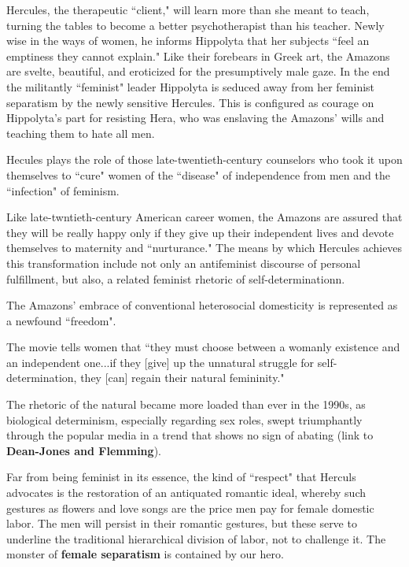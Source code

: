 Hercules, the therapeutic ``client," will learn more than she meant to teach, turning the tables to become a better psychotherapist than his teacher. Newly wise in the ways of women, he informs Hippolyta that her subjects ``feel an emptiness they cannot explain." Like their forebears in Greek art, the Amazons are svelte, beautiful, and eroticized for the presumptively male gaze. In the end the militantly ``feminist" leader Hippolyta is seduced away from her feminist separatism by the newly sensitive Hercules. This is configured as courage on Hippolyta's part for resisting Hera, who was enslaving the Amazons' wills and teaching them to hate all men.

\begin{rmk}
    Hecules plays the role of those late-twentieth-century counselors who took it upon themselves to ``cure" women of the ``disease" of independence from men and the ``infection" of feminism.
\end{rmk}

Like late-twntieth-century American career women, the Amazons are assured that they will be really happy only if they give up their independent lives and devote themselves to maternity and ``nurturance." The means by which Hercules achieves this transformation include not only an antifeminist discourse of personal fulfillment, but also, a related feminist rhetoric of self-determinationn.

\begin{rmk}
    The Amazons' embrace of conventional heterosocial domesticity is represented as a newfound ``freedom".
\end{rmk}

The movie tells women that ``they must choose between a womanly existence and an independent one...if they [give] up the unnatural struggle for self-determination, they [can] regain their natural femininity."

\begin{rmk}
    The rhetoric of the natural became more loaded than ever in the 1990s, as biological determinism, especially regarding sex roles, swept triumphantly through the popular media in a trend that shows no sign of abating (link to \textbf{Dean-Jones and Flemming}).
\end{rmk}

Far from being feminist in its essence, the kind of ``respect" that Herculs advocates is the restoration of an antiquated romantic ideal, whereby such gestures as flowers and love songs are the price men pay for female domestic labor. The men will persist in their romantic gestures, but these serve to underline the traditional hierarchical division of labor, not to challenge it. The monster of \textbf{female separatism} is contained by our hero.

